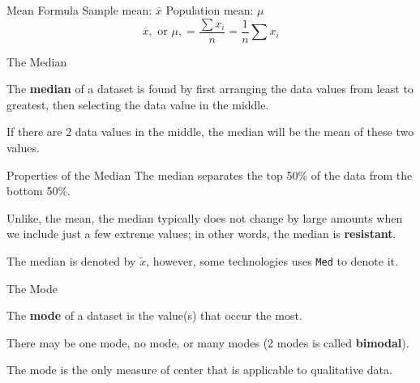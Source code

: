 \documentclass[t]{beamer}
\begin{document}
\begin{frame}{Mean Formula}
Sample mean: $\overline{x}$	\qquad	Population mean: $\mu$	\newline\\	\pause
\[ \overline{x}, \text{ or } \mu, = \frac{\sum x_i}{n} = \frac{1}{n}\sum x_i	\]
\end{frame}

\begin{frame}{The Median}

\begin{tcolorbox}[colframe=green!20!black, colback = green!30!white,title=\textbf{Median}]
The \textbf{median} of a dataset is found by first arranging the data values from least to greatest, then selecting the data value in the middle. 
\end{tcolorbox}
\vspace{11pt}	\pause

If there are 2 data values in the middle, the median will be the mean of these two values.
\end{frame}

\begin{frame}{Properties of the Median}
The median separates the top 50\% of the data from the bottom 50\%.	\newline\\	\pause

Unlike, the mean, the median typically does not change by large amounts when we include just a few extreme values; in other words, the median is \textbf{resistant}.	\newline\\	\pause

The median is denoted by $\tilde{x}$, however, some technologies uses \texttt{Med} to denote it.
\end{frame}

\begin{frame}{The Mode}

\begin{tcolorbox}[colframe=green!20!black, colback = green!30!white,title=\textbf{Mode}]
The \textbf{mode} of a dataset is the value(s) that occur the most.
\end{tcolorbox}
\vspace{11pt}	\pause

There may be one mode, no mode, or many modes (2 modes is called \textbf{bimodal}).	\newline\\	\pause

The mode is the only measure of center that is applicable to qualitative data.
\end{frame}
\end{document}
